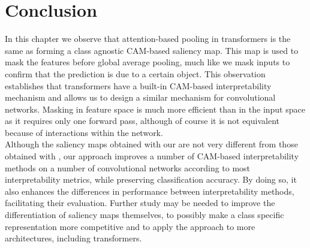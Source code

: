 \section{Conclusion}
\label{sec:ca_conclusion}
In this chapter we observe that attention-based pooling in transformers is the same as 
forming a class agnostic CAM-based saliency map. This map is used to mask the features before 
global average pooling, much like we mask inputs to confirm that the prediction is due to a certain 
object. This observation establishes that transformers have a built-in CAM-based interpretability 
mechanism and allows us to design a similar mechanism for convolutional networks. Masking in feature 
space is much more efficient than in the input space as it requires only one forward pass, although 
of course it is not equivalent because of interactions within the network.\\

\noindent Although the saliency maps obtained with our \Ours are not very different from those 
obtained with \gap, our approach improves a number of CAM-based interpretability methods on a number 
of convolutional networks according to most interpretability metrics, while preserving classification 
accuracy. By doing so, it also enhances the differences in performance between interpretability methods, 
facilitating their evaluation. Further study may be needed to improve the differentiation of saliency 
maps themselves, to possibly make a class specific representation more competitive and to apply the 
approach to more architectures, including transformers.
